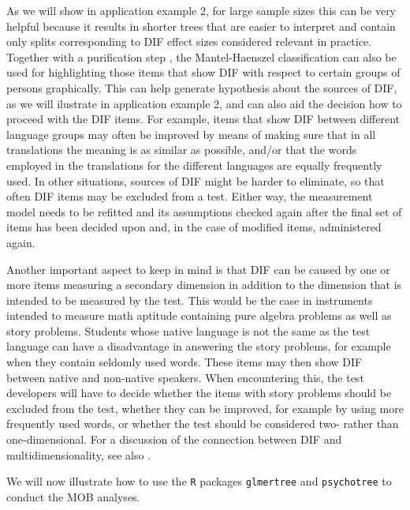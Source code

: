 \documentclass[doc,floatsintext,natbib]{apa7}
\begin{document}
As we will show in application example 2, for large sample sizes this can be very helpful because it results in shorter trees that are easier to interpret and contain only splits corresponding to DIF effect sizes considered relevant in practice. Together with a purification step \citep[see][and application example 2 for details]{HenDebStr:2023:EPM}, the Mantel-Haenszel classification can also be used for highlighting those items that show DIF with respect to certain groups of persons graphically. This can help generate hypothesis about the sources of DIF, as we will ilustrate in application example 2, and can also aid the decision how to proceed with the DIF items. 
For example, items that show DIF between different language groups may often be improved by means of making sure that in all translations the meaning is as similar as possible, and/or that the words employed in the translations for the different languages are equally frequently used. In other situations, sources of DIF might be harder to eliminate, so that often DIF items may be excluded from a test. Either way, the measurement model needs to be refitted and its assumptions checked again after the final set of items has been decided upon and, in the case of modified items, administered again. 

Another important aspect to keep in mind is that DIF can be caused by one or more items measuring a secondary dimension in addition to the dimension that is intended to be measured by the test. This would be the case in instruments intended to measure math aptitude containing pure algebra problems as well as story problems. Students whose native language is not the same as the test language can have a disadvantage in answering the story problems, for example when they contain seldomly used words. These items may then show DIF between native and non-native speakers. When encountering this, the test developers will have to decide whether the items with story problems should be excluded from the test, whether they can be improved, for example by using more frequently used words, or whether the test should be considered two- rather than one-dimensional. For a discussion of the connection between DIF and multidimensionality, see also \cite{Ack:1992,Stretal:2021:APM}.

We will now illustrate how to use the \texttt{R} packages \texttt{glmertree} and \texttt{psychotree} to conduct the MOB analyses. 
\end{document}
